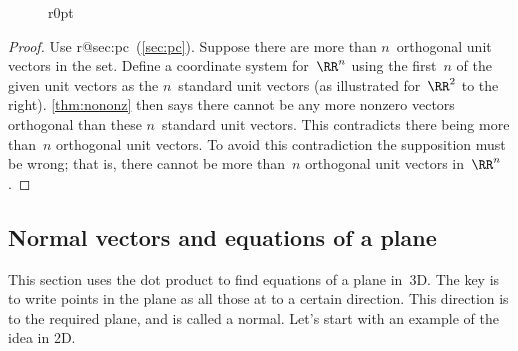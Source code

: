 \begin{wrapfigure}r{0pt}
\end{wrapfigure}
\begin{proof} 
Use %
\ifcsname r@sec:pc\endcsname\ (\cref{sec:pc})\fi.
Suppose there are more than \(n\)~orthogonal unit vectors in the set.
Define a coordinate system for~\(\RR^n\) using the first~\(n\) of the given unit vectors as the \(n\)~standard unit vectors 
(as illustrated for~\(\RR^2\) to the right).
\cref{thm:nononz} then says there cannot be any more nonzero vectors orthogonal than these \(n\)~standard unit vectors.
This contradicts there being more than~\(n\) orthogonal unit vectors.
To avoid this contradiction the supposition must be wrong; that is, there cannot be more than~\(n\) orthogonal unit vectors in~\(\RR^n\).
\par
\end{proof}








\subsection{Normal vectors and equations of a plane}
\label{sec:nvep}


This section uses the dot product to find equations of a plane in~3D.
The key is to write points in the plane as all those at  to a certain direction.  
This direction is  to the required plane, and is called a normal.
Let's start with an example of the idea in 2D.

